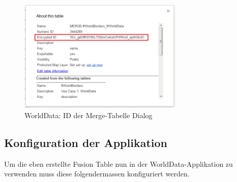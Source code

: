 \begin{figure}[H]
	\centering
	\includegraphics[width=0.7\textwidth]{images/usecase1-worlddata/documentation/worlddata-prepare_fusiontableslayer4}
	\caption{WorldData: ID der Merge-Tabelle Dialog}
	\label{worlddata-prepare_fusiontableslayer4}
\end{figure}

\subsection{Konfiguration der Applikation}
Um die eben erstellte Fusion Table nun in der WorldData-Applikation zu verwenden muss diese folgendermassen konfiguriert werden.

